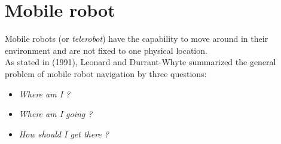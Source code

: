 \section{Mobile robot}
\label{intro:mobile}

Mobile robots (or \textit{telerobot}) have the capability to move around
in their environment and are not fixed to one physical location.
\\
As stated in \cite{robot:whereami} (1991), Leonard and Durrant-Whyte
summarized the general problem of mobile robot navigation
by three questions:

\begin{itemize}
\item \textit{Where am I ?}
\item \textit{Where am I going ?}
\item \textit{How should I get there ?}
\end{itemize}

